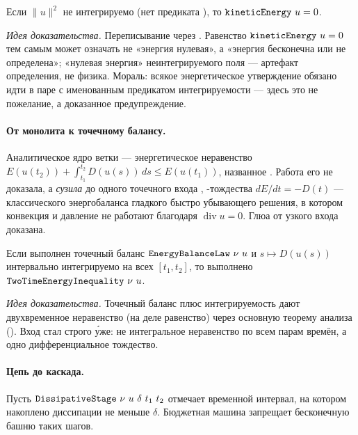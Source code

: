 \begin{theorem}\label{thm:kineticEnergy_of_not_integrable}
Если $\|u\|^2$ не интегрируемо (нет предиката ), то
$\texttt{kineticEnergy}\ u = 0$. \green{}
\end{theorem}

\emph{Идея доказательства.} Переписывание через . Равенство
$\texttt{kineticEnergy}\ u = 0$ тем самым может означать не «энергия нулевая», а «энергия бесконечна
или не определена»; «нулевая энергия» неинтегрируемого поля --- артефакт определения, не физика.
Мораль: всякое энергетическое утверждение обязано идти в паре с именованным предикатом
интегрируемости --- здесь это не пожелание, а доказанное предупреждение.

\paragraph{От монолита к точечному балансу.}
Аналитическое ядро ветки --- энергетическое неравенство
$E(u(t_2)) + \int_{t_1}^{t_2} D(u(s))\,ds \le E(u(t_1))$, названное .
Работа его не доказала, а \emph{сузила} до одного точечного входа ,
-тождества $dE/dt = -D(t)$ --- классического энергобаланса гладкого быстро
убывающего решения, в котором конвекция и давление не работают благодаря $\operatorname{div} u = 0$.
Глюа от узкого входа доказана.

\begin{theorem}\label{thm:twoTimeEnergyInequality_of_energyBalance}
Если выполнен точечный баланс $\texttt{EnergyBalanceLaw}\ \nu\ u$ и $s \mapsto D(u(s))$ интервально
интегрируемо на всех $[t_1,t_2]$, то выполнено $\code{TwoTimeEnergyInequality}\ \nu\ u$. \green{}
\end{theorem}

\emph{Идея доказательства.} Точечный баланс плюс интегрируемость дают двухвременное неравенство (на
деле равенство) через основную теорему анализа
(). Вход стал строго \'{у}же: не интегральное
неравенство по всем парам времён, а одно дифференциальное тождество.

\paragraph{Цепь до каскада.}
Пусть $\code{DissipativeStage}\ \nu\ u\ \delta\ t_1\ t_2$ отмечает временной интервал, на котором
накоплено диссипации не меньше $\delta$. Бюджетная машина запрещает бесконечную башню таких шагов.

